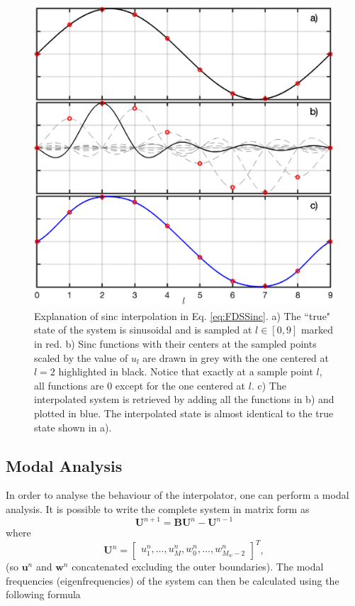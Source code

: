 \documentclass[dvipsnames]{article}
\begin{document}
\begin{figure}[h]
\centerline{\includegraphics[width=0.6\columnwidth]{sincExplanation.eps} }
\caption{\label{fig:sincExp}{Explanation of sinc interpolation in Eq. \eqref{eq:FDSSinc}. a) The ``true" state of the system is sinusoidal and is sampled at $l \in [0, 9]$ marked in red. b) Sinc functions with their centers at the sampled points scaled by the value of $u_l$ are drawn in grey with the one centered at $l = 2$ highlighted in black. Notice that exactly at a sample point $l$, all functions are 0 except for the one centered at $l$. c) The interpolated system is retrieved by adding all the functions in b) and plotted in blue. The interpolated state is almost identical to the true state shown in a).}}
\end{figure}



\subsection{Modal Analysis}\label{sec:modal}
In order to analyse the behaviour of the interpolator, one can perform a modal analysis. It is possible to write the complete system in matrix form as
\begin{equation}
    \mathbf{U}^{n+1} = \mathbf{B}\mathbf{U}^n - \mathbf{U}^{n-1}
\end{equation}
where \begin{equation}
\mathbf{U}^n = \begin{bmatrix}
u^n_1, \hdots, u^n_M, w_0^n, \hdots, w_{M_w-2}^n
\end{bmatrix}^T,
\end{equation}
(so $\mathbf{u}^n$ and $\mathbf{w}^n$ concatenated excluding the outer boundaries).  The modal frequencies (eigenfrequencies) of the system can then be calculated using the following formula \cite[p. 174]{Bilbao2009}
\end{document}
